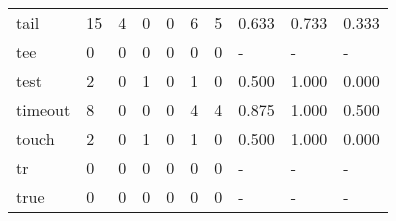 \begin{longtable}{lp{1.3cm}p{1.3cm}p{1.3cm}p{1.3cm}p{1.3cm}p{1.3cm}p{1.3cm}p{1.3cm}p{1.3cm}}
tail      &                     15 &                                  4 &                                 0 &                                0 &                                 6 &                               5 &                                0.633 &                                  0.733 &                                0.333 \\
tee       &                      0 &                                  0 &                                 0 &                                0 &                                 0 &                               0 &                                    - &                                      - &                                    - \\
test      &                      2 &                                  0 &                                 1 &                                0 &                                 1 &                               0 &                                0.500 &                                  1.000 &                                0.000 \\
timeout   &                      8 &                                  0 &                                 0 &                                0 &                                 4 &                               4 &                                0.875 &                                  1.000 &                                0.500 \\
touch     &                      2 &                                  0 &                                 1 &                                0 &                                 1 &                               0 &                                0.500 &                                  1.000 &                                0.000 \\
tr        &                      0 &                                  0 &                                 0 &                                0 &                                 0 &                               0 &                                    - &                                      - &                                    - \\
true      &                      0 &                                  0 &                                 0 &                                0 &                                 0 &                               0 &                                    - &                                      - &                                    - \\

\end{longtable}
